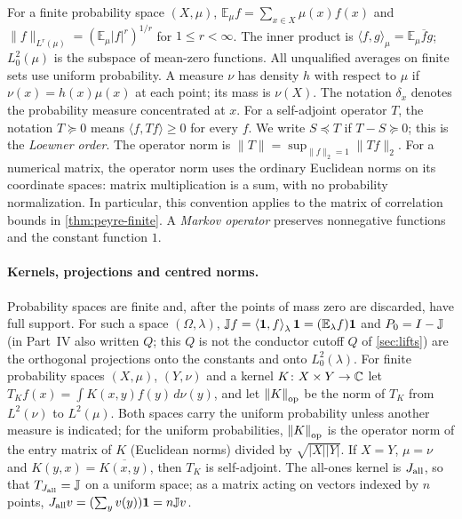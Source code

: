 \begin{definition}\label{def:prelim:operators}
For a finite probability space $(X,\mu)$,
$\mathbb E_\mu f=\sum_{x\in X}\mu(x)f(x)$ and
$\|f\|_{L^r(\mu)}=(\mathbb E_\mu|f|^r)^{1/r}$ for $1\le r<\infty$.
The inner product is $\langle f,g\rangle_\mu=\mathbb E_\mu\overline f g$;
$L^2_0(\mu)$ is the subspace of mean-zero functions.
All unqualified averages on finite sets use uniform probability.
A measure $\nu$ has density $h$ with respect to $\mu$ if
$\nu(x)=h(x)\mu(x)$ at each point; its mass is $\nu(X)$. The notation
$\delta_x$ denotes the probability measure concentrated at $x$.
For a self-adjoint operator $T$, the notation $T\succeq0$ means
$\langle f,Tf\rangle\ge0$ for every $f$. We write $S\preceq T$
if $T-S\succeq0$; this is the \emph{Loewner order}.
The operator norm is $\|T\|=\sup_{\|f\|_2=1}\|Tf\|_2$.
For a numerical matrix, the operator norm uses the ordinary Euclidean
norms on its coordinate spaces: matrix multiplication is a sum, with
no probability normalization. In particular, this convention applies
to the matrix of correlation bounds in \cref{thm:peyre-finite}.
A \emph{Markov operator} preserves nonnegative functions and the
constant function $1$.
\end{definition}

\paragraph{Kernels, projections and centred norms.}
Probability spaces are finite and, after the points of mass zero are
discarded, have full support. For such a space $(\Omega,\lambda)$,
$\mathbb J f=\left\langle \mathbf 1,f\right\rangle_\lambda\mathbf 1=(\mathbb E_\lambda f)\mathbf 1$ and
$P_0=I-\mathbb J$ (in Part~IV also written $Q$; this $Q$ is not the
conductor cutoff $Q$ of \cref{sec:lifts}) are the
orthogonal projections onto the constants and onto
$L^2_0(\lambda)$. For finite probability spaces $(X,\mu)$, $(Y,\nu)$ and a
kernel $K\colon X\times Y\to\mathbb C$ let $T_Kf(x)=\int K(x,y)f(y)\,d\nu(y)$, and let
$\left\|K\right\|_{\mathrm{op}}$ be the norm of $T_K$ from $L^2(\nu)$ to $L^2(\mu)$. Both spaces carry
the uniform probability unless another measure is indicated; for the uniform
probabilities, $\left\|K\right\|_{\mathrm{op}}$ is the operator norm of the entry matrix of $K$
(Euclidean norms) divided by $\sqrt{|X||Y|}$. If
$X=Y$, $\mu=\nu$ and $K(y,x)=\overline{K(x,y)}$, then $T_K$ is self-adjoint. The
all-ones kernel is $J_{\mathrm{all}}$, so that $T_{J_{\mathrm{all}}}=\mathbb J$ on a uniform space; as a
matrix acting on vectors indexed by $n$ points, $J_{\mathrm{all}} v=(\sum_yv(y))\mathbf 1=n\mathbb J v$.

